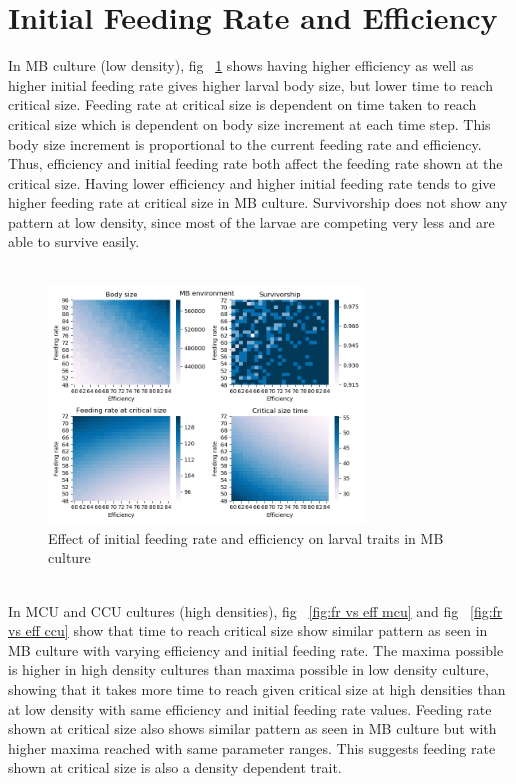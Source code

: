\section{Initial Feeding Rate and Efficiency}
In MB culture (low density), fig ~\ref{fig:fr vs eff mb} shows having higher efficiency as well as higher initial feeding rate gives higher larval body size, but lower time to reach critical size. Feeding rate at critical size is dependent on time taken to reach critical size which is dependent on body size increment at each time step. This body size increment is proportional to the current feeding rate and efficiency. Thus, efficiency and initial feeding rate both affect the feeding rate shown at the critical size. Having lower efficiency and higher initial feeding rate tends to give higher feeding rate at critical size in MB culture. Survivorship does not show any pattern at low density, since most of the larvae are competing very less and are able to survive easily. \\ \\
\begin{figure}[h]
  \centering
  \includegraphics[width=0.75\textwidth]{C3/Figs/Feeding rate_vs_Efficiency_MB}
  \caption{Effect of initial feeding rate and efficiency on larval traits in MB culture}
  \label{fig:fr vs eff mb}
\end{figure}\\
In MCU and CCU cultures (high densities), fig ~\ref{fig:fr vs eff mcu} and fig ~\ref{fig:fr vs eff ccu} show that time to reach critical size show similar pattern as seen in MB culture with varying efficiency and initial feeding rate. The maxima possible is higher in high density cultures than maxima possible in low density culture, showing that it takes more time to reach given critical size at high densities than at low density with same efficiency and initial feeding rate values. Feeding rate shown at critical size also shows similar pattern as seen in MB culture but with higher maxima reached with same parameter ranges. This suggests feeding rate shown at critical size is also a density dependent trait.
